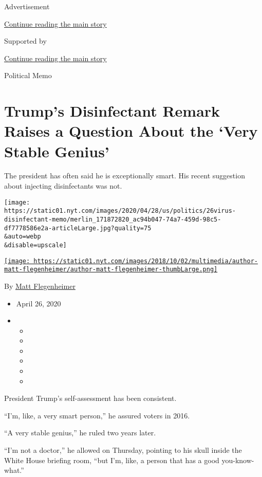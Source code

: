 Advertisement

\protect\hyperlink{after-top}{Continue reading the main story}

Supported by

\protect\hyperlink{after-sponsor}{Continue reading the main story}

Political Memo

\hypertarget{trumps-disinfectant-remark-raises-a-question-about-the-very-stable-genius}{%
\section{Trump's Disinfectant Remark Raises a Question About the `Very
Stable
Genius'}\label{trumps-disinfectant-remark-raises-a-question-about-the-very-stable-genius}}

The president has often said he is exceptionally smart. His recent
suggestion about injecting disinfectants was not.

\texttt{[image: https://static01.nyt.com/images/2020/04/28/us/politics/26virus-disinfectant-memo/merlin\_171872820\_ac94b047-74a7-459d-98c5-df7778586e2a-articleLarge.jpg?quality=75\\\&auto=webp\\\&disable=upscale]}

\href{https://www.nytimes.com/by/matt-flegenheimer}{\texttt{[image: https://static01.nyt.com/images/2018/10/02/multimedia/author-matt-flegenheimer/author-matt-flegenheimer-thumbLarge.png]}}

By \href{https://www.nytimes.com/by/matt-flegenheimer}{Matt
Flegenheimer}

\begin{itemize}
\item
  April 26, 2020
\item
  \begin{itemize}
  \item
  \item
  \item
  \item
  \item
  \item
  \end{itemize}
\end{itemize}

President Trump's self-assessment has been consistent.

``I'm, like, a very smart person,'' he assured voters in 2016.

``A very stable genius,'' he ruled two years later.

``I'm not a doctor,'' he allowed on Thursday, pointing to his skull
inside the White House briefing room, ``but I'm, like, a person that has
a good you-know-what.''

